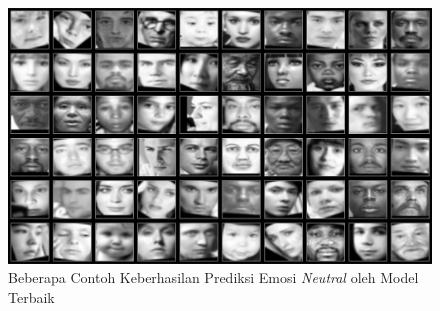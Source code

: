 \begin{figure}[!t]
    \centering
    \includegraphics[width=14cm]{gambar/contoh_hasil_prediksi_true_neutral.png}
    \caption{Beberapa Contoh Keberhasilan Prediksi Emosi \textit{Neutral} oleh Model Terbaik}
    \label{fig:hasilprediksitrue6}
\end{figure}


